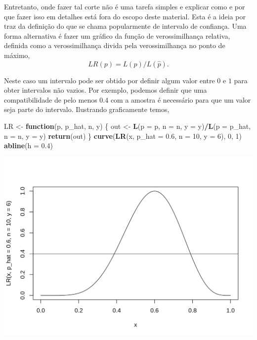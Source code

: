 \documentclass[10pt,a4paper]{book}
\newenvironment{Shaded}{\begin{snugshade}}{\end{snugshade}}
\newcommand{\KeywordTok}[1]{\textcolor[rgb]{0.13,0.29,0.53}{\textbf{#1}}}
\newcommand{\DataTypeTok}[1]{\textcolor[rgb]{0.13,0.29,0.53}{#1}}
\newcommand{\DecValTok}[1]{\textcolor[rgb]{0.00,0.00,0.81}{#1}}
\newcommand{\FloatTok}[1]{\textcolor[rgb]{0.00,0.00,0.81}{#1}}
\newcommand{\StringTok}[1]{\textcolor[rgb]{0.31,0.60,0.02}{#1}}
\newcommand{\ControlFlowTok}[1]{\textcolor[rgb]{0.13,0.29,0.53}{\textbf{#1}}}
\newcommand{\OperatorTok}[1]{\textcolor[rgb]{0.81,0.36,0.00}{\textbf{#1}}}
\newcommand{\NormalTok}[1]{#1}
\begin{document}
Entretanto, onde fazer tal corte não é uma tarefa simples e explicar
como e por que fazer isso em detalhes está fora do escopo deste
material. Esta é a ideia por traz da definição do que se chama
popularmente de intervalo de confiança. Uma forma alternativa é fazer um
gráfico da função de verossimilhança relativa, definida como a
verossimilhança divida pela verossimilhança no ponto de máximo, \[
LR(p) = L(p)/L(\hat{p}).
\]

Neste caso um intervalo pode ser obtido por definir algum valor entre
\(0\) e \(1\) para obter intervalos não vazios. Por exemplo, podemos
definir que uma compatibilidade de pelo menos 0.4 com a amostra é
necessário para que um valor seja parte do intervalo. Ilustrando
graficamente temos,

\begin{Shaded}
\begin{Highlighting}[]
\NormalTok{LR <-}\StringTok{ }\ControlFlowTok{function}\NormalTok{(p, p_hat, n, y) \{}
\NormalTok{  out <-}\StringTok{ }\KeywordTok{L}\NormalTok{(}\DataTypeTok{p =}\NormalTok{ p, }\DataTypeTok{n =}\NormalTok{ n, }\DataTypeTok{y =}\NormalTok{ y)}\OperatorTok{/}\KeywordTok{L}\NormalTok{(}\DataTypeTok{p =}\NormalTok{ p_hat, }\DataTypeTok{n =}\NormalTok{ n, }\DataTypeTok{y =}\NormalTok{ y)}
  \KeywordTok{return}\NormalTok{(out)}
\NormalTok{\}}
\KeywordTok{curve}\NormalTok{(}\KeywordTok{LR}\NormalTok{(x, }\DataTypeTok{p_hat =} \FloatTok{0.6}\NormalTok{, }\DataTypeTok{n =} \DecValTok{10}\NormalTok{, }\DataTypeTok{y =} \DecValTok{6}\NormalTok{), }\DecValTok{0}\NormalTok{, }\DecValTok{1}\NormalTok{)}
\KeywordTok{abline}\NormalTok{(}\DataTypeTok{h =} \FloatTok{0.4}\NormalTok{)}
\end{Highlighting}
\end{Shaded}

\begin{center}\includegraphics{figures/unnamed-chunk-377-1} \end{center}
\end{document}
